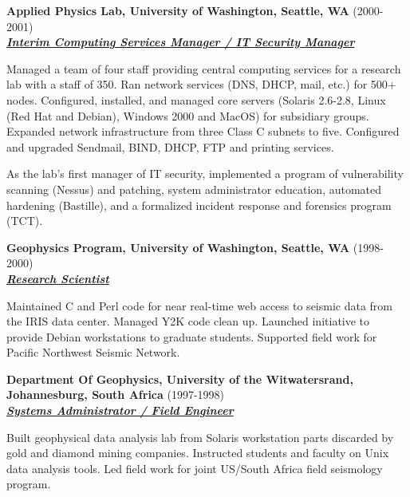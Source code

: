 \documentclass{article}
\newcommand{\employer}[3]{{ \textbf{#1} (#2)\\ \underline{\textbf{\emph{#3}}}\\ \nopagebreak }}
\newenvironment{achievements}{\begin{list}{\topsep 0pt \itemsep -2pt}} {\vspace*{4pt}\end{list}}
\begin{document}
\employer{Applied Physics Lab, University of Washington, Seattle, WA
}{2000-2001}{Interim Computing Services Manager / IT Security Manager}
\begin{achievements}
    \item Managed a team of four staff providing central computing services for a research lab with a staff of 350. Ran network services (DNS, DHCP, mail, etc.) for 500+ nodes. Configured, installed, and managed core servers (Solaris 2.6-2.8, Linux (Red Hat and Debian), Windows 2000 and MacOS) for subsidiary groups.  Expanded network infrastructure from three Class C subnets to five.  Configured and upgraded Sendmail, BIND, DHCP, FTP and printing services.
    \item As the lab's first manager of IT security, implemented a program of vulnerability scanning (Nessus) and patching, system administrator education, automated hardening (Bastille), and a formalized incident response and forensics program (TCT).
\end{achievements}

\employer{Geophysics Program, University of Washington, Seattle, WA}{1998-2000}{Research Scientist}
\begin{achievements}
    \item Maintained C and Perl code for near real-time web access to seismic data from the IRIS data center.  Managed Y2K code clean up.  Launched initiative to provide Debian workstations to graduate students.  Supported field work for Pacific Northwest Seismic Network.
\end{achievements}

\employer{Department Of Geophysics, University of the Witwatersrand,
Johannesburg, South Africa}{1997-1998}{Systems Administrator / Field Engineer}
\begin{achievements}
    \item Built geophysical data analysis lab from Solaris workstation parts discarded by gold and diamond mining companies.  Instructed students and faculty on Unix data analysis tools.  Led field work for joint US/South Africa field seismology program.
\end{achievements}
\end{document}
